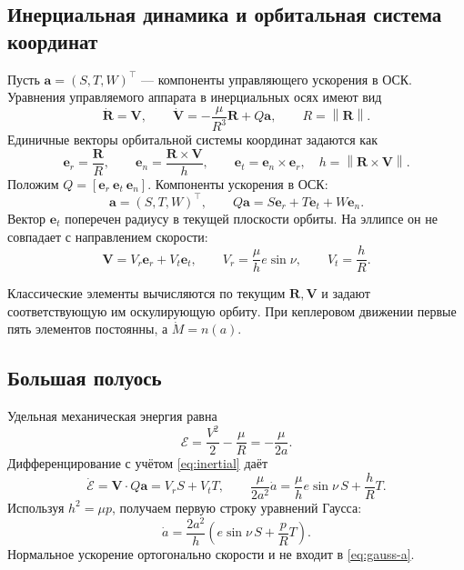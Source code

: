 \documentclass[a4paper,11pt]{article}
\numberwithin{equation}{section}
\theoremstyle{remark}
\newcommand{\vect}[1]{\boldsymbol{#1}}
\newcommand{\norm}[1]{\left\lVert#1\right\rVert}
\begin{document}
\subsection{Инерциальная динамика и орбитальная система координат}

Пусть $\vect a=(S,T,W)^\top$ --- компоненты управляющего
ускорения в ОСК. Уравнения управляемого аппарата в инерциальных осях
имеют вид
\begin{equation}
 \dot{\vect R}=\vect V,\qquad
 \dot{\vect V}=-\frac{\mu}{R^3}\vect R+Q\vect a,
 \qquad R=\norm{\vect R}.
 \label{eq:inertial}
\end{equation}
Единичные векторы орбитальной системы координат задаются как
\begin{equation}
 \vect e_r=\frac{\vect R}{R},\qquad
 \vect e_n=\frac{\vect R\times\vect V}{h},\qquad
 \vect e_t=\vect e_n\times\vect e_r,
 \quad h=\norm{\vect R\times\vect V}.
 \label{eq:RTN}
\end{equation}
Положим $Q=[\vect e_r\ \vect e_t\ \vect e_n]$. Компоненты ускорения в ОСК:
\begin{equation}
 \vect a=(S,T,W)^\top,\qquad Q\vect a=S\vect e_r+T\vect e_t+W\vect e_n.
 \label{eq:control-components}
\end{equation}
Вектор $\vect e_t$ поперечен радиусу в текущей плоскости орбиты.
На эллипсе он не совпадает с направлением скорости:
\[
 \vect V=V_r\vect e_r+V_t\vect e_t,
 \qquad
 V_r=\frac{\mu}{h}e\sin\nu,\qquad V_t=\frac{h}{R}.
\]

Классические элементы вычисляются по текущим $\vect R,\vect V$
и задают соответствующую им оскулирующую орбиту.
При кеплеровом движении первые пять элементов постоянны,
а $\dot M=n(a)$.

\subsection{Большая полуось}

Удельная механическая энергия равна
\begin{equation}
 \mathcal E=\frac{V^2}{2}-\frac{\mu}{R}=-\frac{\mu}{2a}.
 \label{eq:energy}
\end{equation}
Дифференцирование с учётом \eqref{eq:inertial} даёт
\[
 \dot{\mathcal E}=\vect V\cdot Q\vect a=V_rS+V_tT,
 \qquad
 \frac{\mu}{2a^2}\dot a=\frac{\mu}{h}e\sin\nu\,S+\frac{h}{R}T.
\]
Используя $h^2=\mu p$, получаем первую строку уравнений Гаусса:
\begin{equation}
 \dot a=\frac{2a^2}{h}
       \left(e\sin\nu\,S+\frac pR T\right).
 \label{eq:gauss-a}
\end{equation}
Нормальное ускорение ортогонально скорости и не входит в
\eqref{eq:gauss-a}.
\end{document}
